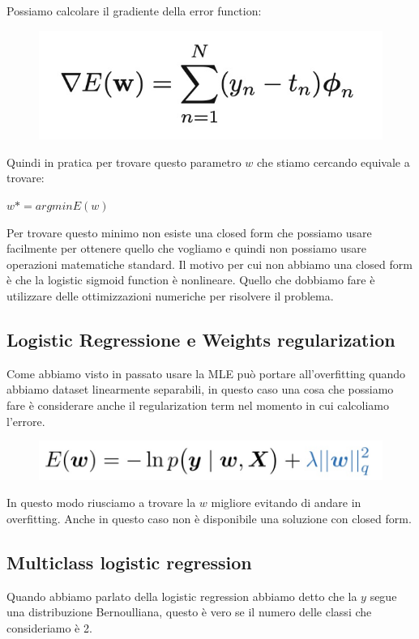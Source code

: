 \documentclass[14pt]{extreport}
\begin{document}
Possiamo calcolare il gradiente della error function:

\begin{figure}[H]
\centering
\includegraphics[width=0.7\linewidth]{212.jpeg}
\end{figure}

Quindi in pratica per trovare questo parametro $w$ che stiamo cercando equivale a trovare:

$w* = argmin E(w)$

Per trovare questo minimo non esiste una closed form che possiamo usare facilmente per ottenere quello che vogliamo e quindi non possiamo usare
operazioni matematiche standard. Il motivo per cui non abbiamo una closed form è che la logistic sigmoid function è nonlineare. Quello che dobbiamo
fare è utilizzare delle ottimizzazioni numeriche per risolvere il problema.

\subsection{Logistic Regressione e Weights regularization}

Come abbiamo visto in passato usare la MLE può portare all'overfitting quando abbiamo dataset linearmente separabili, in questo caso una cosa che
possiamo fare è considerare anche il regularization term nel momento in cui calcoliamo l'errore.


\begin{figure}[H]
\centering
\includegraphics[width=0.5\linewidth]{193.jpeg}
\end{figure}

In questo modo riusciamo a trovare la $w$ migliore evitando di andare in overfitting. Anche in questo caso non è disponibile una soluzione con closed
form.

\subsection{Multiclass logistic regression}

Quando abbiamo parlato della logistic regression abbiamo detto che la $y$ segue una distribuzione Bernoulliana, questo è vero se il numero delle
classi che consideriamo è 2.
\end{document}
